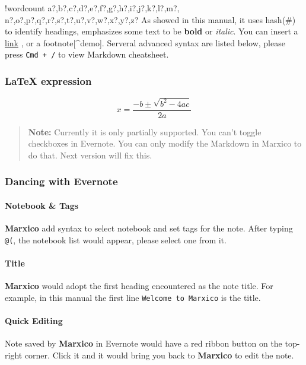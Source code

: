 \documentclass{article}
\let\oldparagraph\paragraph
\renewcommand{\paragraph}[1]{\oldparagraph{#1}\mbox{}}
\newcounter{words}
\newenvironment{counted}{%
  \setcounter{words}{0}
  \SearchList!{wordcount}{\stepcounter{words}}
    {a?,b?,c?,d?,e?,f?,g?,h?,i?,j?,k?,l?,m?,
    n?,o?,p?,q?,r?,s?,t?,u?,v?,w?,x?,y?,z?}
  \UndoBoundary{'}
  \SearchOrder{p;}}{%
  \StopSearching}
\begin{document}
\begin{counted}
As showed in this manual, it uses hash(\#) to identify headings,
emphasizes some text to be \textbf{bold} or \emph{italic}. You can
insert a \href{http://www.example.com}{link} , or a
footnote{[}\^{}demo{]}. Serveral advanced syntax are listed below,
please press \texttt{Cmd\ +\ /} to view Markdown cheatsheet.

\subsubsection{LaTeX expression}\label{latex-expression}

\[ x = \dfrac{-b \pm \sqrt{b^2 - 4ac}}{2a} \]

\begin{quote}
\textbf{Note:} Currently it is only partially supported. You can't
toggle checkboxes in Evernote. You can only modify the Markdown in
Marxico to do that. Next version will fix this.
\end{quote}

\subsubsection{Dancing with Evernote}\label{dancing-with-evernote}

\paragraph{Notebook \& Tags}\label{notebook-tags}

\textbf{Marxico} add syntax to select notebook and set tags for the
note. After typing \texttt{@(}, the notebook list would appear, please
select one from it.

\paragraph{Title}\label{title}

\textbf{Marxico} would adopt the first heading encountered as the note
title. For example, in this manual the first line
\texttt{Welcome\ to\ Marxico} is the title.

\paragraph{Quick Editing}\label{quick-editing}

Note saved by \textbf{Marxico} in Evernote would have a red ribbon
button on the top-right corner. Click it and it would bring you back to
\textbf{Marxico} to edit the note.


\end{counted}
\end{document}
